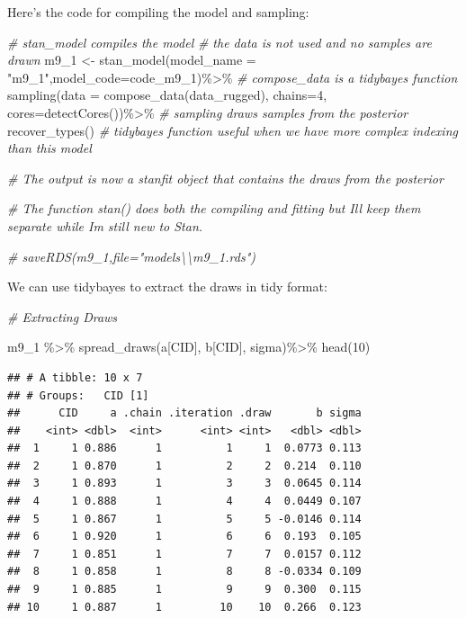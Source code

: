 \documentclass[
]{book}
\newenvironment{Shaded}{\begin{snugshade}}{\end{snugshade}}
\newcommand{\AttributeTok}[1]{\textcolor[rgb]{0.77,0.63,0.00}{#1}}
\newcommand{\CommentTok}[1]{\textcolor[rgb]{0.56,0.35,0.01}{\textit{#1}}}
\newcommand{\DecValTok}[1]{\textcolor[rgb]{0.00,0.00,0.81}{#1}}
\newcommand{\FunctionTok}[1]{\textcolor[rgb]{0.00,0.00,0.00}{#1}}
\newcommand{\NormalTok}[1]{#1}
\newcommand{\OtherTok}[1]{\textcolor[rgb]{0.56,0.35,0.01}{#1}}
\newcommand{\SpecialCharTok}[1]{\textcolor[rgb]{0.00,0.00,0.00}{#1}}
\newcommand{\StringTok}[1]{\textcolor[rgb]{0.31,0.60,0.02}{#1}}
\begin{document}
Here's the code for compiling the model and sampling:

\begin{Shaded}
\begin{Highlighting}[]
\CommentTok{\# stan\_model compiles the model}
\CommentTok{\# the data is not used and no samples are drawn}
\NormalTok{m9\_1 }\OtherTok{\textless{}{-}} \FunctionTok{stan\_model}\NormalTok{(}\AttributeTok{model\_name =} \StringTok{"m9\_1"}\NormalTok{,}\AttributeTok{model\_code=}\NormalTok{code\_m9\_1)}\SpecialCharTok{\%\textgreater{}\%} \CommentTok{\# compose\_data is a tidybayes function}
          \FunctionTok{sampling}\NormalTok{(}\AttributeTok{data =} \FunctionTok{compose\_data}\NormalTok{(data\_rugged), }\AttributeTok{chains=}\DecValTok{4}\NormalTok{, }\AttributeTok{cores=}\FunctionTok{detectCores}\NormalTok{())}\SpecialCharTok{\%\textgreater{}\%} \CommentTok{\# sampling draws samples from the posterior}
          \FunctionTok{recover\_types}\NormalTok{() }\CommentTok{\# tidybayes function useful when we have more complex indexing than this model}
  

\CommentTok{\# The output is now a stanfit object that contains the draws from the posterior}

\CommentTok{\# The function stan() does both the compiling and fitting but I\textquotesingle{}ll keep them separate while I\textquotesingle{}m still new to Stan.}

\CommentTok{\# saveRDS(m9\_1,file="models\textbackslash{}\textbackslash{}m9\_1.rds")}
\end{Highlighting}
\end{Shaded}

We can use tidybayes to extract the draws in tidy format:

\begin{Shaded}
\begin{Highlighting}[]
\CommentTok{\# Extracting Draws}

\NormalTok{m9\_1 }\SpecialCharTok{\%\textgreater{}\%} 
  \FunctionTok{spread\_draws}\NormalTok{(a[CID], b[CID], sigma)}\SpecialCharTok{\%\textgreater{}\%}
  \FunctionTok{head}\NormalTok{(}\DecValTok{10}\NormalTok{)}
\end{Highlighting}
\end{Shaded}

\begin{verbatim}
## # A tibble: 10 x 7
## # Groups:   CID [1]
##      CID     a .chain .iteration .draw       b sigma
##    <int> <dbl>  <int>      <int> <int>   <dbl> <dbl>
##  1     1 0.886      1          1     1  0.0773 0.113
##  2     1 0.870      1          2     2  0.214  0.110
##  3     1 0.893      1          3     3  0.0645 0.114
##  4     1 0.888      1          4     4  0.0449 0.107
##  5     1 0.867      1          5     5 -0.0146 0.114
##  6     1 0.920      1          6     6  0.193  0.105
##  7     1 0.851      1          7     7  0.0157 0.112
##  8     1 0.858      1          8     8 -0.0334 0.109
##  9     1 0.885      1          9     9  0.300  0.115
## 10     1 0.887      1         10    10  0.266  0.123
\end{verbatim}
\end{document}
